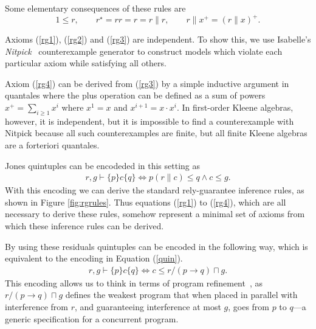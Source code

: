 \documentclass{llncs}
\begin{document}
Some elementary consequences of these rules are
\begin{equation*}
1 \le r,\qquad
r^\star = rr = r = r\|r,\qquad
r\|x^+ = (r\|x)^+.
\end{equation*}

Axioms (\ref{rg1}), (\ref{rg2}) and (\ref{rg3}) are independent. To
show this, we use Isabelle's
\emph{Nitpick}~\cite{blanchette_nitpick:_2010} counterexample
generator to construct models which violate each particular axiom
while satisfying all others.

Axiom (\ref{rg4}) can be derived from (\ref{rg3}) by a simple
inductive argument in quantales where the plus operation can be
defined as a sum of powers $x^+=\sum_{i\ge 1} x^i$ where $x^1=x$
and $x^{i+1}=x\cdot x^i$. In first-order Kleene algebras, however, it
is independent, but it is impossible to find a counterexample with Nitpick because all such counterexamples are finite, but all finite Kleene algebras are a forteriori quantales.

Jones quintuples can be encodeded in this setting as
\begin{align}
r, g \vdash \{p\} c \{q\} \iff p(r\|c) \le q \land c \le g. \label{quin}
\end{align}
With this encoding we can derive the standard rely-guarantee inference
rules, as shown in Figure \ref{fig:rgrules}. Thus equations
(\ref{rg1}) to (\ref{rg4}), which are all necessary to derive these
rules, somehow represent a minimal set of axioms from which these
inference rules can be derived.

By using these residuals quintuples can be encoded in the following way,
which is equivalent to the encoding in Equation (\ref{quin}).
\begin{align}
r, g \vdash \{p\} c \{q\} \iff c \le r/(p \rightarrow q) \sqcap g \label{refine}.
\end{align}
This encoding allows us to think in terms of program refinement~\cite{hayes_refining_2013}, as
$r/(p \rightarrow q) \sqcap g$ defines the weakest program that when
placed in parallel with interference from $r$, and guaranteeing
interference at most $g$, goes from $p$ to $q$---a generic
specification for a concurrent program.
\end{document}
